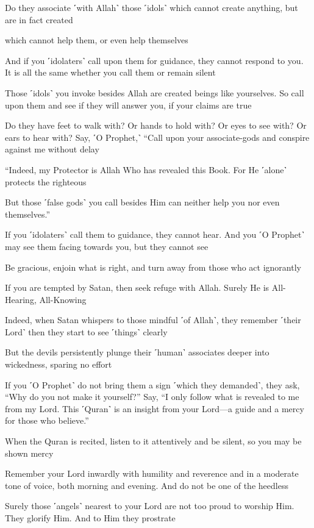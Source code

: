 Do they associate ˹with Allah˺ those ˹idols˺ which cannot create anything, but are in fact created

which cannot help them, or even help themselves

And if you ˹idolaters˺ call upon them for guidance, they cannot respond to you. It is all the same whether you call them or remain silent

Those ˹idols˺ you invoke besides Allah are created beings like yourselves. So call upon them and see if they will answer you, if your claims are true

Do they have feet to walk with? Or hands to hold with? Or eyes to see with? Or ears to hear with? Say, ˹O Prophet,˺ “Call upon your associate-gods and conspire against me without delay

“Indeed, my Protector is Allah Who has revealed this Book. For He ˹alone˺ protects the righteous

But those ˹false gods˺ you call besides Him can neither help you nor even themselves.”

If you ˹idolaters˺ call them to guidance, they cannot hear. And you ˹O Prophet˺ may see them facing towards you, but they cannot see

Be gracious, enjoin what is right, and turn away from those who act ignorantly

If you are tempted by Satan, then seek refuge with Allah. Surely He is All-Hearing, All-Knowing

Indeed, when Satan whispers to those mindful ˹of Allah˺, they remember ˹their Lord˺ then they start to see ˹things˺ clearly

But the devils persistently plunge their ˹human˺ associates deeper into wickedness, sparing no effort

If you ˹O Prophet˺ do not bring them a sign ˹which they demanded˺, they ask, “Why do you not make it yourself?” Say, “I only follow what is revealed to me from my Lord. This ˹Quran˺ is an insight from your Lord—a guide and a mercy for those who believe.”

When the Quran is recited, listen to it attentively and be silent, so you may be shown mercy

Remember your Lord inwardly with humility and reverence and in a moderate tone of voice, both morning and evening. And do not be one of the heedless

Surely those ˹angels˺ nearest to your Lord are not too proud to worship Him. They glorify Him. And to Him they prostrate


